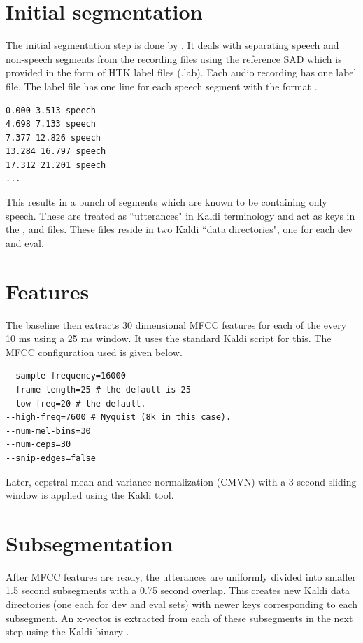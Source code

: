 \section{Initial segmentation}
The initial segmentation step is done by . It deals with separating speech and non-speech segments from the recording files using the reference SAD which is provided in the form of HTK label files (.lab). Each audio recording has one label file. The label file has one line for each speech segment with the format .

\begin{verbatim}
0.000 3.513 speech
4.698 7.133 speech
7.377 12.826 speech
13.284 16.797 speech
17.312 21.201 speech
...
\end{verbatim}

This results in a bunch of segments which are known to be containing only speech. These are treated as ``utterances" in Kaldi terminology and act as keys in the ,  and  files. These files reside in two Kaldi ``data directories", one for each dev and eval.

\section{Features}
The baseline then extracts 30 dimensional MFCC features for each of the every 10 ms using a 25 ms window. It uses the standard  Kaldi script for this. The MFCC configuration used  is given below.

\begin{verbatim}
--sample-frequency=16000
--frame-length=25 # the default is 25
--low-freq=20 # the default.
--high-freq=7600 # Nyquist (8k in this case).
--num-mel-bins=30
--num-ceps=30
--snip-edges=false
\end{verbatim}

Later, cepstral mean and variance normalization (CMVN) with a 3 second sliding window is applied using the  Kaldi tool.

\section{Subsegmentation}
After MFCC features are ready, the utterances are uniformly divided into smaller 1.5 second subsegments with a 0.75 second overlap. This creates new Kaldi data directories (one each for dev and eval sets) with newer keys corresponding to each subsegment. An x-vector is extracted from each of these subsegments in the next step using the Kaldi binary .


